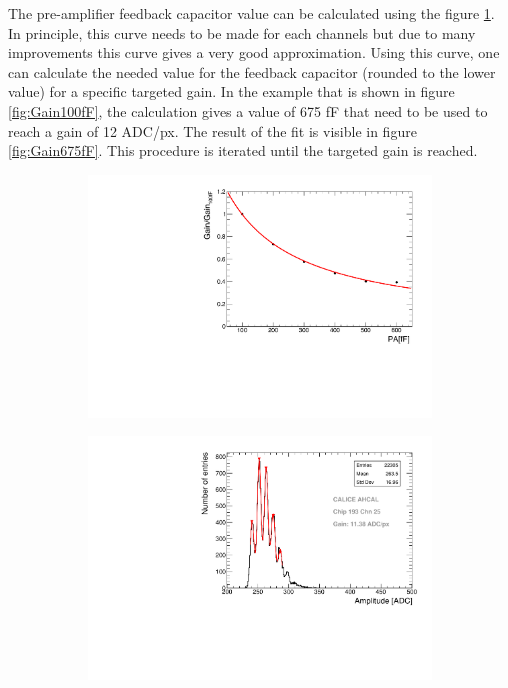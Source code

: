 The pre-amplifier feedback capacitor value can be calculated using the figure \ref{fig:PA_curve}. In principle, this curve needs to be made for each channels but due to many improvements this curve gives a very good approximation. Using this curve, one can calculate the needed value for the feedback capacitor (rounded to the lower value) for a specific targeted gain. In the example that is shown in figure \ref{fig:Gain100fF}, the calculation gives a value of 675 fF that need to be used to reach a gain of 12 ADC/px. The result of the fit is visible in figure \ref{fig:Gain675fF}. This procedure is iterated until the targeted gain is reached. %

\begin{figure}[htbp!]
  \centering
  \begin{subfigure}[t]{0.49\textwidth}
    \includegraphics[width=1.\linewidth]{../Thesis_Plots/Commissioning/Plots/GainvsPA.pdf}
    \caption{} \label{fig:PA_curve}
  \end{subfigure}
  \hfill
  \begin{subfigure}[t]{0.49\textwidth}
    \includegraphics[width=1.\linewidth]{../Thesis_Plots/Commissioning/Plots/Gain675fF_MainzHBU4.pdf}

\end{subfigure}
\end{figure}
